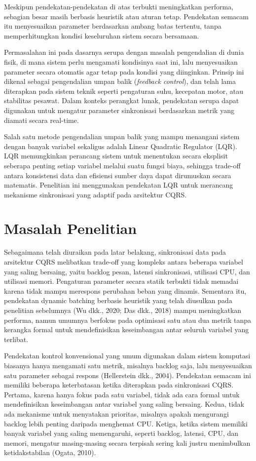 Meskipun pendekatan-pendekatan di atas terbukti meningkatkan performa, sebagian besar masih berbasis heuristik atau aturan tetap.
Pendekatan semacam itu menyesuaikan parameter berdasarkan ambang batas tertentu, tanpa memperhitungkan kondisi keseluruhan sistem secara bersamaan.

Permasalahan ini pada dasarnya serupa dengan masalah pengendalian di dunia fisik, di mana sistem perlu mengamati kondisinya saat ini, lalu menyesuaikan parameter secara otomatis agar tetap pada kondisi yang diinginkan.
Prinsip ini dikenal sebagai pengendalian umpan balik (\emph{feedback control}), dan telah lama diterapkan pada sistem teknik seperti pengaturan suhu, kecepatan motor, atau stabilitas pesawat.
Dalam konteks perangkat lunak, pendekatan serupa dapat digunakan untuk mengatur parameter sinkronisasi berdasarkan metrik yang diamati secara real-time.

Salah satu metode pengendalian umpan balik yang mampu menangani sistem dengan banyak variabel sekaligus adalah Linear Quadratic Regulator (LQR).
LQR memungkinkan perancang sistem untuk menentukan secara eksplisit seberapa penting setiap variabel melalui suatu fungsi biaya, sehingga trade-off antara konsistensi data dan efisiensi sumber daya dapat dirumuskan secara matematis.
Penelitian ini menggunakan pendekatan LQR untuk merancang mekanisme sinkronisasi yang adaptif pada arsitektur CQRS.

\section{Masalah Penelitian}

Sebagaimana telah diuraikan pada latar belakang, sinkronisasi data pada arsitektur CQRS melibatkan trade-off yang kompleks antara beberapa variabel yang saling bersaing, yaitu backlog pesan, latensi sinkronisasi, utilisasi CPU, dan utilisasi memori.
Pengaturan parameter secara statik terbukti tidak memadai karena tidak mampu merespons perubahan beban yang dinamis.
Sementara itu, pendekatan dynamic batching berbasis heuristik yang telah diusulkan pada penelitian sebelumnya (Wu dkk., 2020; Das dkk., 2018) mampu meningkatkan performa, namun umumnya berfokus pada optimisasi satu atau dua metrik tanpa kerangka formal untuk mendefinisikan keseimbangan antar seluruh variabel yang terlibat.

Pendekatan kontrol konvensional yang umum digunakan dalam sistem komputasi biasanya hanya mengamati satu metrik, misalnya backlog saja, lalu menyesuaikan satu parameter sebagai respons (Hellerstein dkk., 2004).
Pendekatan semacam ini memiliki beberapa keterbatasan ketika diterapkan pada sinkronisasi CQRS.
Pertama, karena hanya fokus pada satu variabel, tidak ada cara formal untuk mendefinisikan keseimbangan antar variabel yang saling bersaing.
Kedua, tidak ada mekanisme untuk menyatakan prioritas, misalnya apakah mengurangi backlog lebih penting daripada menghemat CPU.
Ketiga, ketika sistem memiliki banyak variabel yang saling memengaruhi, seperti backlog, latensi, CPU, dan memori, mengatur masing-masing secara terpisah sering kali justru menimbulkan ketidakstabilan (Ogata, 2010).

